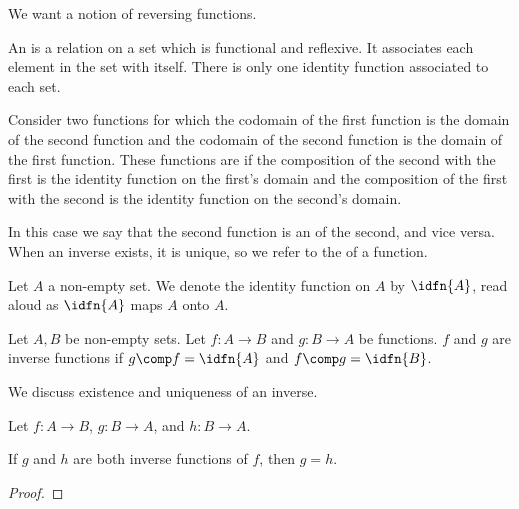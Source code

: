 
\sbasic












\sstart
{}


We want a notion
of reversing functions.


An
is
a relation on a set
which is functional and
reflexive.
It associates
each element in the
set with itself.
There is only one
identity function
associated to each set.

Consider
two functions
for which the codomain
of the first function
is the domain of the
second function and
the codomain of the second
function is the domain
of the first function.
These functions are
if the composition of the
second with the first
is the identity
function
on the first's domain
and the composition of
the first with the second
is the identity
function on the
second's domain.

In this case we say
that the second function
is an
of the second, and vice versa.
When an inverse exists,
it is unique, so we refer to
the 
of a function.


Let $A$ a non-empty set.
We denote the identity
function on $A$ by $\idfn{A}$,
read aloud as
$\idfn{A}$ maps $A$ onto $A$.

Let $A, B$ be non-empty sets.
Let $f: A \to B$ and $g: B \to A$
be functions.
$f$ and $g$ are inverse functions
if $g \comp f = \idfn{A}$
and $f \comp g = \idfn{B}$.


We discuss existence and
uniqueness of an inverse.

\begin{prop}
  Let $f: A \to B$,
  $g: B \to A$,
  and $h: B \to A$.

  If $g$ and $h$
  are both inverse
  functions of $f$,
  then $g = h$.

  \begin{proof}
  \end{proof}
\end{prop}

